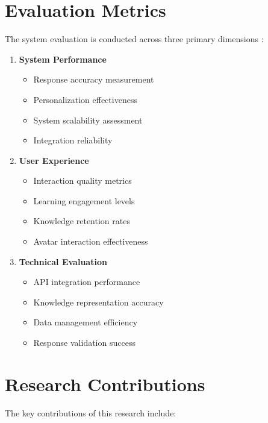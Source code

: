 \section{Evaluation Metrics}
\label{sec:evaluation-metrics}

The system evaluation is conducted across three primary dimensions \cite{huang2024survey}:

\begin{enumerate}
    \item \textbf{System Performance}
        \begin{itemize}
            \item Response accuracy measurement
            \item Personalization effectiveness
            \item System scalability assessment
            \item Integration reliability
        \end{itemize}
    
    \item \textbf{User Experience}
        \begin{itemize}
            \item Interaction quality metrics
            \item Learning engagement levels
            \item Knowledge retention rates
            \item Avatar interaction effectiveness
        \end{itemize}
    
    \item \textbf{Technical Evaluation}
        \begin{itemize}
            \item API integration performance
            \item Knowledge representation accuracy
            \item Data management efficiency
            \item Response validation success
        \end{itemize}
\end{enumerate}

\section{Research Contributions}
\label{sec:research-contributions}

The key contributions of this research include:

